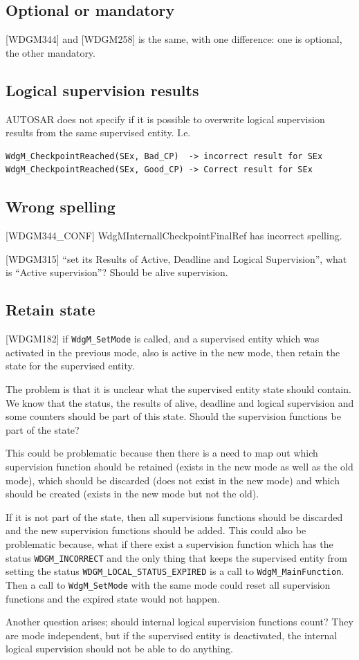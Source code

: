 \subsection*{Optional or mandatory}
[WDGM344] and [WDGM258] is the same, with one difference: one is optional, the
other mandatory.

\subsection*{Logical supervision results}
AUTOSAR does not specify if it is possible to overwrite logical supervision
results from the same supervised entity.
I.e.
\begin{lstlisting}
WdgM_CheckpointReached(SEx, Bad_CP)  -> incorrect result for SEx
WdgM_CheckpointReached(SEx, Good_CP) -> Correct result for SEx
\end{lstlisting}

\subsection*{Wrong spelling}
[WDGM344\_CONF] WdgMInternallCheckpointFinalRef has incorrect
spelling.

[WDGM315] ``set its Results of Active, Deadline and Logical Supervision'',
what is ``Active supervision''? Should be alive supervision.

\subsection*{Retain state}
[WDGM182] if \lstinline!WdgM_SetMode! is called, and a supervised
entity which was activated in the previous mode, also is active in the
new mode, then retain the state for the supervised entity.

The problem is that it is unclear what the supervised entity state
should contain. We know that the status, the results of alive,
deadline and logical supervision and some counters should be part of
this state. Should the supervision functions be part of the state?

This could be problematic because then there is a need to map out
which supervision function should be retained (exists in the new mode
as well as the old mode), which should be discarded (does not exist
in the new mode) and which should be created (exists in the new mode
but not the old).

If it is not part of the state, then all supervisions functions should
be discarded and the new supervision functions should be added.
This could also be problematic because, what if there exist a
supervision function which has the status \lstinline!WDGM_INCORRECT!
and the only thing that keeps the supervised entity from setting the
status \lstinline!WDGM_LOCAL_STATUS_EXPIRED! is a call to
\lstinline!WdgM_MainFunction!. Then a call to \lstinline!WdgM_SetMode!
with the same mode could reset all supervision functions and the
expired state would not happen.

Another question arises; should internal logical supervision functions
count?
They are mode independent, but if the supervised entity is
deactivated, the internal logical supervision should not be able to do anything.

